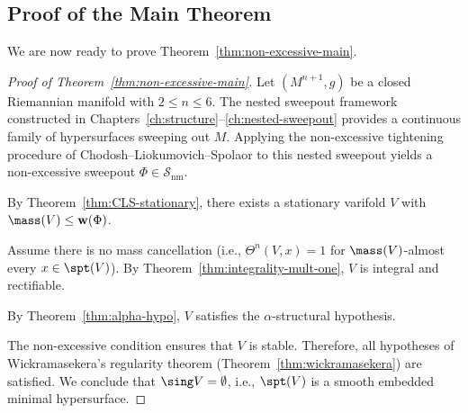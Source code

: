 \subsection{Proof of the Main Theorem}

We are now ready to prove Theorem~\ref{thm:non-excessive-main}.

\begin{proof}[Proof of Theorem~\ref{thm:non-excessive-main}]
Let $(M^{n+1}, g)$ be a closed Riemannian manifold with $2 \leq n \leq 6$. The nested sweepout
framework constructed in Chapters~\ref{ch:structure}--\ref{ch:nested-sweepout} provides a continuous
family of hypersurfaces sweeping out $M$. Applying the non-excessive tightening procedure of
Chodosh--Liokumovich--Spolaor to this nested sweepout yields a non-excessive sweepout
$\Phi \in \mathcal{S}_{\text{nm}}$.

By Theorem~\ref{thm:CLS-stationary}, there exists a stationary varifold $V$ with $\mass(V) \leq \mathbf{w}(\Phi)$.

Assume there is no mass cancellation (i.e., $\Theta^n(V,x)=1$ for $\mass(V)$-almost every $x \in \spt(V)$).
By Theorem~\ref{thm:integrality-mult-one}, $V$ is integral and rectifiable.

By Theorem~\ref{thm:alpha-hypo}, $V$ satisfies the $\alpha$-structural hypothesis.

The non-excessive condition ensures that $V$ is stable. Therefore, all hypotheses of Wickramasekera's regularity
theorem (Theorem~\ref{thm:wickramasekera}) are satisfied. We conclude that $\sing V = \emptyset$, i.e., $\spt(V)$
is a smooth embedded minimal hypersurface.
\end{proof}

